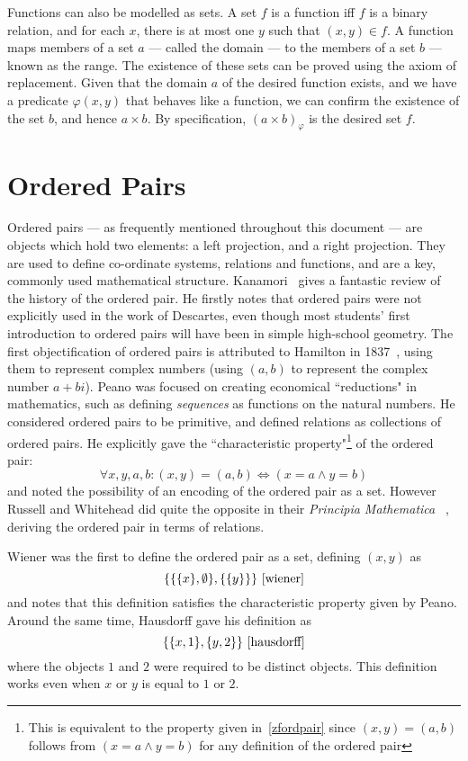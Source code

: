 \documentclass[11pt]{report}
\theoremstyle{definition}
\theoremstyle{theorem}
\theoremstyle{lemma}
\begin{document}
Functions can also be modelled as sets.
A set $f$ is a function iff $f$ is a binary relation, and for each $x$, there is at most one $y$ such that $(x,y)\in f$.
A function maps members of a set $a$ --- called the domain --- to the members of a set $b$ --- known as the range.
The existence of these sets can be proved using the axiom of replacement.
Given that the domain $a$ of the desired function exists, and we have a predicate $\varphi(x,y)$ that behaves like a function, we can confirm the existence of the set $b$, and hence $a\times b$.
By specification, $(a\times b)_\varphi$ is the desired set $f$.

\section{Ordered Pairs}\label{OP}
Ordered pairs ---  as frequently mentioned throughout this document --- are objects which hold two elements: a left projection, and a right projection. 
They are used to define co-ordinate systems, relations and functions, and are a key, commonly used mathematical structure. 
Kanamori~\cite{kanamori} gives a fantastic review of the history of the ordered pair. 
He firstly notes that ordered pairs were not explicitly used in the work of Descartes, even though most students' first introduction to ordered pairs will have been in simple high-school geometry.
The first objectification of ordered pairs is attributed to Hamilton in 1837~\cite{hamilton}, using them to represent complex numbers (using $(a,b)$ to represent the complex number $a+bi$).
Peano \cite{peano} was focused on creating economical ``reductions" in mathematics, such as defining \emph{sequences} as functions on the natural numbers. 
He considered ordered pairs to be primitive, and defined relations as collections of ordered pairs. 
He explicitly gave the ``characteristic property"\footnote{This is equivalent to the property given in~\ref{zfordpair} since $(x,y)=(a,b)$ follows from $(x=a\wedge y=b)$ for any definition of the ordered pair}  of the ordered pair:
$$\forall x,y,a,b: (x,y) = (a,b) \iff (x=a \wedge y=b)$$
and noted the possibility of an encoding of the ordered pair as a set.   
However Russell and Whitehead did quite the opposite in their \emph{Principia Mathematica} ~\cite{pm}, deriving the ordered pair in terms of relations. 

Wiener was the first to define the ordered pair as a set, defining $(x,y)$ as
$$\{\{\{x\},\emptyset\},\{\{y\}\}\}~\cite{wiener}$$ 
and notes that this definition satisfies the characteristic property given by Peano.
Around the same time, Hausdorff gave his definition as 
$$\{\{x,1\},\{y,2\}\}~\cite{hausdorff}$$ 
where the objects $1$ and $2$ were required to be distinct objects.
This definition works even when $x$ or $y$ is equal to $1$ or $2$. 
\end{document}
